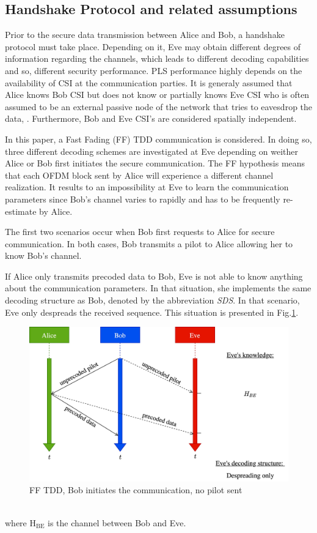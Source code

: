 \documentclass[journal,comsoc]{IEEEtran}
\let\MYoriglatexcaption\caption
\renewcommand{\caption}[2][\relax]{\MYoriglatexcaption[#2]{#2}}
\newcommand{\mat}[1]{\boldsymbol{\mathrm{#1}}}
\begin{document}
\subsection{Handshake Protocol and related assumptions}\label{sec:establishment}
Prior to the secure data transmission between Alice and Bob, a handshake protocol must take place. Depending on it, Eve may obtain different degrees of information regarding the channels, which leads to different decoding capabilities and so, different security performance. PLS performance highly depends on the availability of CSI at the communication parties. It is generaly assumed that Alice knows Bob CSI but does not know or partially knows Eve CSI  who is often assumed to be an external passive node of the network that tries to eavesdrop the data, \cite{8509094}. Furthermore, Bob and Eve CSI's are considered spatially independent.

In this paper, a Fast Fading (FF) TDD communication is considered. In doing so, three different decoding schemes are investigated at Eve depending on weither Alice or Bob first initiates the secure communication. The FF hypothesis means that each OFDM block sent by Alice will experience a different channel realization. It results to an impossibility at Eve to learn the communication parameters since Bob's channel varies to rapidly and has to be frequently re-estimate by Alice. 

The first two scenarios occur when Bob first requests to Alice for secure communication. In both cases, Bob transmits a pilot to Alice allowing her to know Bob's channel.

If Alice only transmits precoded data to Bob, Eve is not able to know anything about the communication parameters. In that situation, she implements the same decoding structure as Bob, denoted by the abbreviation \textit{SDS}. In that scenario, Eve only despreads the received sequence. This situation is presented in Fig.\ref{fig_ff_tdd_b_no_pilot}.
\begin{figure}[!htb]
	\centering
	\includegraphics[width=.9\linewidth]{graphs/diagram_sequence-FF_TDD_B_no_pilot.jpg}
	\caption{FF TDD, Bob initiates the communication, no pilot sent}
	\label{fig_ff_tdd_b_no_pilot}
\end{figure} \\
where $\mat{H}_{\text{BE}}$ is the channel between Bob and Eve. 
\end{document}
